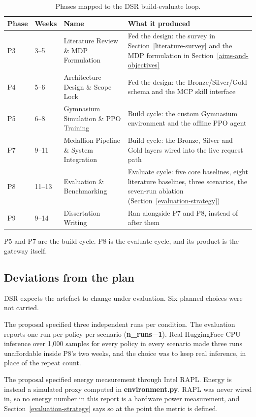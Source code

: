 {\small\setlength{\tabcolsep}{4pt}
\begin{longtable}{p{1.0cm}p{1.6cm}p{4.4cm}p{5.9cm}}
\caption{Phases mapped to the DSR build-evaluate loop.}\label{tab:phases}\\
\toprule
Phase & Weeks & Name & What it produced \\
\midrule
\endhead
P3 & 3--5 & Literature Review \& MDP Formulation & Fed the design: the
survey in Section~\ref{literature-survey} and the MDP formulation in Section~\ref{aims-and-objectives} \\
P4 & 5--6 & Architecture Design \& Scope Lock & Fed the design: the
Bronze/Silver/Gold schema and the MCP skill interface \\
P5 & 6--8 & Gymnasium Simulation \& PPO Training & Build cycle: the
custom Gymnasium environment and the offline PPO agent \\
P7 & 9--11 & Medallion Pipeline \& System Integration & Build cycle: the
Bronze, Silver and Gold layers wired into the live request path \\
P8 & 11--13 & Evaluation \& Benchmarking & Evaluate cycle: five core
baselines, eight literature baselines, three scenarios, the seven-run
ablation (Section~\ref{evaluation-strategy}) \\
P9 & 9--14 & Dissertation Writing & Ran alongside P7 and P8, instead of
after them \\
\bottomrule
\end{longtable}}

P5 and P7 are the build cycle. P8 is the evaluate cycle, and its product
is the gateway itself.

\hypertarget{deviations-from-the-plan}{%
\subsection{Deviations from the plan}\label{deviations-from-the-plan}}

DSR expects the artefact to change under evaluation. Six planned choices
were not carried.

The proposal specified three independent runs per condition. The
evaluation reports one run per policy per scenario (\textbf{n\_runs=1}). 
Real HuggingFace CPU inference over 1,000 samples for every policy in every 
scenario made three runs unaffordable inside P8's two weeks, and the choice 
was to keep real inference, in place of the repeat count.

The proposal specified energy measurement through Intel RAPL. Energy is
instead a simulated proxy computed in \textbf{environment.py}. RAPL was
never wired in, so no energy number in this report is a hardware power
measurement, and Section~\ref{evaluation-strategy} says so at the point the metric is defined.

